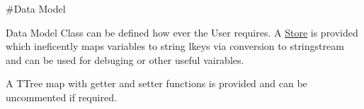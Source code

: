 \#\-Data Model 



Data Model Class can be defined how ever the User requires. A \hyperlink{classStore}{Store} is provided which ineficently maps variables to string lkeys via conversion to stringstream and can be used for debuging or other useful vairables.

A T\-Tree map with getter and setter functions is provided and can be uncommented if required. 
